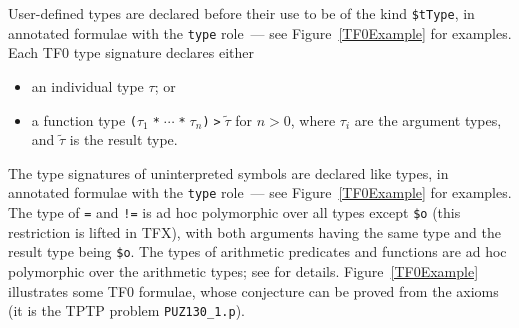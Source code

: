 \documentclass{easychair}
\begin{document}
User-defined types are declared before their use to be of the kind
{\tt \$tType}, in annotated formulae with the {\tt type} role~--- see
Figure~\ref{TF0Example} for examples.
Each TF0 type signature declares either
\begin{itemize}
\item an individual type $\tau$; or
\item a function type {\tt ($\tau_1\;$*$\;{\cdots}\;$*$\;\tau_n$)$\;$>$\;\tilde \tau$}
      for $n > 0$, where $\tau_i$ are the argument types, and $\tilde \tau$
      is the result type.
\end{itemize}

The type signatures of uninterpreted symbols are declared like types, in
annotated formulae with the {\tt type} role~--- see Figure~\ref{TF0Example}
for examples.
The type of {\tt =} and {\tt !=} is ad hoc polymorphic over all types 
except {\tt \$o} (this restriction is lifted in TFX), with both arguments 
having the same type and the result type being {\tt \$o}.
The types of arithmetic predicates and functions are ad hoc polymorphic
over the arithmetic types; see \cite{SS+12} for details.
Figure~\ref{TF0Example} illustrates some TF0 formulae, whose conjecture can
be proved from the axioms (it is the TPTP problem {\tt PUZ130\_1.p}).
\end{document}
